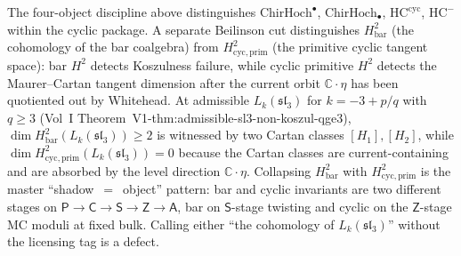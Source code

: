 \begin{remark}
\label{rem:bar-vs-cyclic-primitive}
The four-object discipline above distinguishes
$\mathrm{ChirHoch}^\bullet$, $\mathrm{ChirHoch}_\bullet$,
$\mathrm{HC}^{\mathrm{cyc}}$, $\mathrm{HC}^{-}$ within the cyclic
package. A separate Beilinson cut distinguishes
$H^2_{\mathrm{bar}}$ (the cohomology of the bar coalgebra) from
$H^2_{\mathrm{cyc, prim}}$ (the primitive cyclic tangent space): bar
$H^2$ detects Koszulness failure, while cyclic primitive $H^2$
detects the Maurer--Cartan tangent dimension after the current orbit
$\mathbb{C} \cdot \eta$ has been quotiented out by Whitehead. At
admissible $L_k(\mathfrak{sl}_3)$ for $k = -3 + p/q$ with $q \ge 3$
\textup{(}Vol~I Theorem~\textup{V1-thm:admissible-sl3-non-koszul-qge3}\textup{)},
$\dim H^2_{\mathrm{bar}}(L_k(\mathfrak{sl}_3)) \ge 2$ is witnessed by
two Cartan classes $[H_1], [H_2]$, while
$\dim H^2_{\mathrm{cyc, prim}}(L_k(\mathfrak{sl}_3)) = 0$ because the
Cartan classes are current-containing and are absorbed by the level
direction $\mathbb{C} \cdot \eta$. Collapsing
$H^2_{\mathrm{bar}}$ with $H^2_{\mathrm{cyc, prim}}$ is the master
``shadow~$=$~object'' pattern: bar and cyclic invariants are two
different stages on $\mathsf P \to \mathsf C \to \mathsf S \to \mathsf Z \to \mathsf A$,
bar on $\mathsf S$-stage twisting and cyclic on the $\mathsf Z$-stage
MC moduli at fixed bulk. Calling either ``the cohomology of
$L_k(\mathfrak{sl}_3)$'' without the licensing tag is a defect.
\end{remark}


